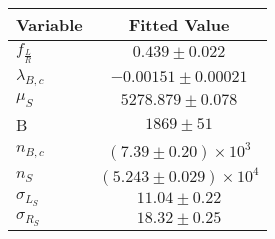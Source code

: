 \begin{tabular}[t]{lc}
\hline
Variable &Fitted Value\\
\hline\hline
$f_{\frac{L}{R}}$&$0.439\pm0.022$\\
\hline
$\lambda_{B,c}$&$-0.00151\pm0.00021$\\
\hline
$\mu_S$&$5278.879\pm0.078$\\
\hline
B&$1869\pm51$\\
\hline
$n_{B,c}$&$(7.39\pm0.20)\times 10^3$\\
\hline
$n_S$&$(5.243\pm0.029)\times 10^4$\\
\hline
$\sigma_{L_S}$&$11.04\pm0.22$\\
\hline
$\sigma_{R_S}$&$18.32\pm0.25$\\
\hline
\end{tabular}